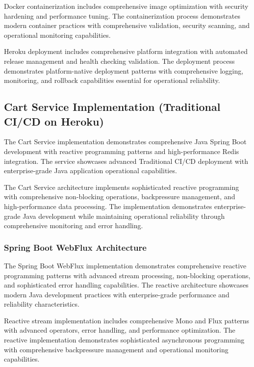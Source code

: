Docker containerization includes comprehensive image optimization with security hardening and performance tuning. The containerization process demonstrates modern container practices with comprehensive validation, security scanning, and operational monitoring capabilities.

Heroku deployment includes comprehensive platform integration with automated release management and health checking validation. The deployment process demonstrates platform-native deployment patterns with comprehensive logging, monitoring, and rollback capabilities essential for operational reliability.

\subsection{Cart Service Implementation (Traditional CI/CD on Heroku)}

The Cart Service implementation demonstrates comprehensive Java Spring Boot development with reactive programming patterns and high-performance Redis integration. The service showcases advanced Traditional CI/CD deployment with enterprise-grade Java application operational capabilities.

The Cart Service architecture implements sophisticated reactive programming with comprehensive non-blocking operations, backpressure management, and high-performance data processing. The implementation demonstrates enterprise-grade Java development while maintaining operational reliability through comprehensive monitoring and error handling.

\subsubsection{Spring Boot WebFlux Architecture}

The Spring Boot WebFlux implementation demonstrates comprehensive reactive programming patterns with advanced stream processing, non-blocking operations, and sophisticated error handling capabilities. The reactive architecture showcases modern Java development practices with enterprise-grade performance and reliability characteristics.

Reactive stream implementation includes comprehensive Mono and Flux patterns with advanced operators, error handling, and performance optimization. The reactive implementation demonstrates sophisticated asynchronous programming with comprehensive backpressure management and operational monitoring capabilities.

